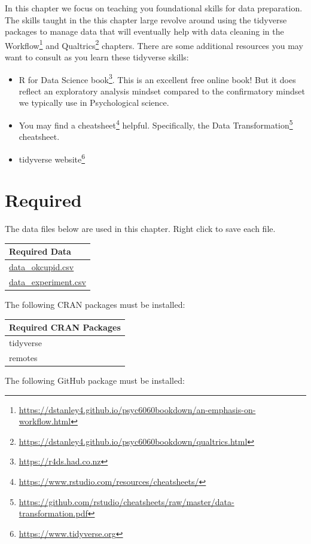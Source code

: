 \documentclass[
]{krantz}
\renewcommand{\href}[2]{#2\footnote{\url{#1}}}
\begin{document}
In this chapter we focus on teaching you foundational skills for data preparation. The skills taught in the this chapter large revolve around using the tidyverse packages to manage data that will eventually help with data cleaning in the \href{https://dstanley4.github.io/psyc6060bookdown/an-emphasis-on-workflow.html}{Workflow} and \href{https://dstanley4.github.io/psyc6060bookdown/qualtrics.html}{Qualtrics} chapters. There are some additional resources you may want to consult as you learn these tidyverse skills:

\begin{itemize}
\item
  \href{https://r4ds.had.co.nz}{R for Data Science book}. This is an excellent free online book! But it does reflect an exploratory analysis mindset compared to the confirmatory mindset we typically use in Psychological science.
\item
  You may find a \href{https://www.rstudio.com/resources/cheatsheets/}{cheatsheet} helpful. Specifically, the \href{https://github.com/rstudio/cheatsheets/raw/master/data-transformation.pdf}{Data Transformation} cheatsheet.
\item
  \href{https://www.tidyverse.org}{tidyverse website}
\end{itemize}

\hypertarget{required}{%
\section{Required}\label{required}}

The data files below are used in this chapter. Right click to save each file.

\begin{longtable}[]{@{}l@{}}
\toprule
Required Data \\
\midrule
\endhead
\url{data_okcupid.csv} \\
\url{data_experiment.csv} \\
\bottomrule
\end{longtable}

The following CRAN packages must be installed:

\begin{longtable}[]{@{}l@{}}
\toprule
Required CRAN Packages \\
\midrule
\endhead
tidyverse \\
remotes \\
\bottomrule
\end{longtable}

The following GitHub package must be installed:
\end{document}

